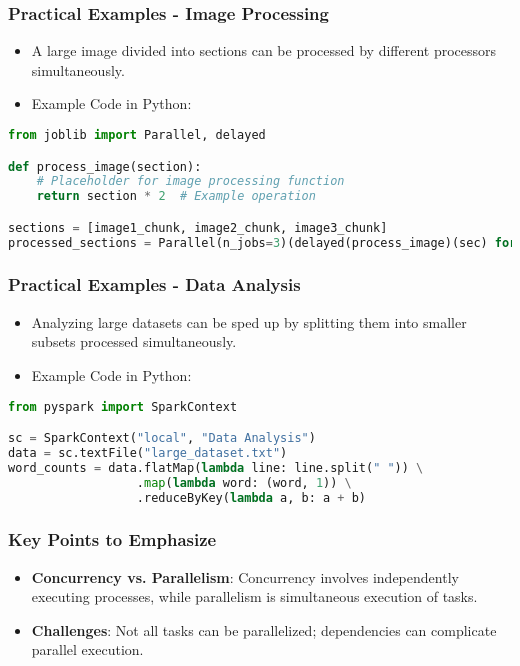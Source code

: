 \documentclass[aspectratio=169]{beamer}
\begin{document}
\begin{frame}[fragile]
    \frametitle{Practical Examples - Image Processing}

    \begin{itemize}
        \item A large image divided into sections can be processed by different processors simultaneously.
        \item Example Code in Python:
    \end{itemize}

    \begin{lstlisting}[language=Python]
from joblib import Parallel, delayed

def process_image(section):
    # Placeholder for image processing function
    return section * 2  # Example operation

sections = [image1_chunk, image2_chunk, image3_chunk]
processed_sections = Parallel(n_jobs=3)(delayed(process_image)(sec) for sec in sections)
    \end{lstlisting}
\end{frame}

\begin{frame}[fragile]
    \frametitle{Practical Examples - Data Analysis}

    \begin{itemize}
        \item Analyzing large datasets can be sped up by splitting them into smaller subsets processed simultaneously.
        \item Example Code in Python:
    \end{itemize}

    \begin{lstlisting}[language=Python]
from pyspark import SparkContext

sc = SparkContext("local", "Data Analysis")
data = sc.textFile("large_dataset.txt")
word_counts = data.flatMap(lambda line: line.split(" ")) \
                  .map(lambda word: (word, 1)) \
                  .reduceByKey(lambda a, b: a + b)
    \end{lstlisting}
\end{frame}

\begin{frame}[fragile]
    \frametitle{Key Points to Emphasize}

    \begin{itemize}
        \item \textbf{Concurrency vs. Parallelism}: Concurrency involves independently executing processes, while parallelism is simultaneous execution of tasks.
        \item \textbf{Challenges}: Not all tasks can be parallelized; dependencies can complicate parallel execution.
    \end{itemize}
\end{frame}
\end{document}
